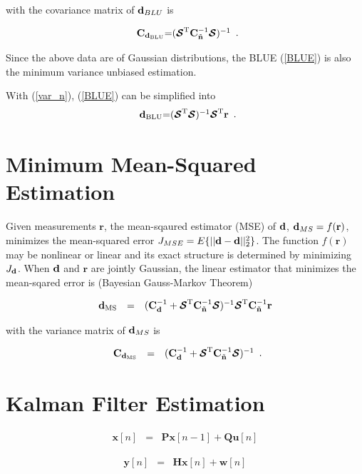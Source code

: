 \documentclass[a4paper,11pt,fleqn]{article}
\newcommand{\br}{{\mathbf r}}
\newcommand{\bC}{{\bf C}}
\newcommand{\bd}{{\bf d}}
\newcommand{\bn}{{\bf n}}
\newcommand{\bcS}{{\mbox {\boldmath ${\cal S}$}}}
\begin{document}
\noindent with the covariance matrix of ${\bd}_{BLU}$ is

\begin{equation}
\begin{array}{rcl}
{\bC}_{\bd_{\rm BLU}}$=$(\bcS^{\rm
T}\bC_{\tilde{\bn}}^{-1}\bcS)^{-1}
\end{array}.
\end{equation}

\noindent Since the above data are of Gaussian distributions, the
BLUE (\ref{BLUE}) is also the minimum variance unbiased
estimation.

With (\ref{var_n}), (\ref{BLUE}) can be simplified into
\begin{equation}
\begin{array}{rcl}
{\bd}_{\rm BLU}$=$(\bcS^{\rm T}\bcS)^{-1}\bcS^{\rm T}\br
\end{array}.
\end{equation}



\section{Minimum Mean-Squared Estimation}
Given measurements $\br$, the mean-sqaured estimator (MSE) of
$\bd$, ${\bd}_{MS} = f( \br )$, minimizes the mean-squared error
$J_{MSE}=E\{||\bd-{\bd}||_2^2\}$. The function $f(\br)$ may be
nonlinear or linear and its exact structure is determined by
minimizing $J_{\bd}$. When $\bd$ and $\br$ are jointly Gaussian,
the linear estimator that minimizes the mean-sqared error is
(Bayesian Gauss-Markov Theorem)

\begin{equation}
\begin{array}{rcl}
{\bd}_{\rm MS} &=& (\bC_{\bd}^{-1}+\bcS^{\rm
T}\bC_{\tilde{\bn}}^{-1}\bcS)^{-1}\bcS^{\rm
T}\bC_{\tilde{\bn}}^{-1}\br
\end{array} \label{MSE}
\end{equation}

\noindent with the variance matrix of ${\bd}_{MS}$ is

\begin{equation}
\begin{array}{rcl}
\bC_{{\bd}_{\rm MS}} &=& (\bC_{\bd}^{-1}+\bcS^{\rm
T}\bC_{\tilde{\bn}}^{-1}\bcS)^{-1}
\end{array}.
\end{equation}

\section{Kalman Filter Estimation}
\begin{equation}
\begin{array}{rcl}
\mathbf{x}[n]&=&\mathbf{P}\mathbf{x}[n-1] +
\mathbf{Q}\mathbf{u}[n]
\end{array} \label{KFE_SF}
\end{equation}

\begin{equation}
\begin{array}{rcl}
\mathbf{y}[n]&=&\mathbf{H}\mathbf{x}[n] + \mathbf{w}[n]
\end{array} \label{KFE_SF}
\end{equation}






\end{document}
